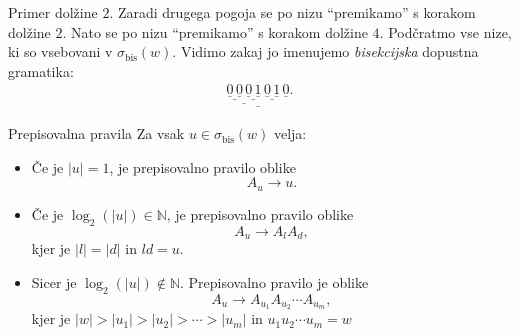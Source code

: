 \documentclass{beamer}
\theoremstyle{definition}
\providecommand{\abs}[1]{\left\lvert #1 \right\rvert}
\newcommand{\N}{\mathbb{N}}
\begin{document}
\begin{frame}
{\begin{exampleblock}{Primer}
            dolžine $2$. Zaradi drugega pogoja se po nizu ``premikamo'' s korakom dolžine $2$.
            Nato se po nizu ``premikamo'' s korakom dolžine $4$. 
            Podčratmo vse nize, ki so vsebovani v $\sigma_{\text{bis}}(w)$. Vidimo zakaj jo imenujemo
            \emph{bisekcijska} dopustna gramatika:
            \begin{gather*}
                \underline{\underline{\underline{\underline{0} \, \underline{0}} \,
                \underline{\underline{0} \, \underline{1}}} \, \underline{\underline{0} \, \underline{1}}
                \, \underline{0}}.
            \end{gather*}
        \end{exampleblock}
    }
\end{frame}

\begin{frame}
    \begin{block}{Prepisovalna pravila}
        Za vsak $u \in \sigma_{\text{bis}}(w)$ velja:
        \begin{itemize}
            \item Če je $\abs{u} = 1$, je prepisovalno pravilo oblike
            \[
                A_u \rightarrow u.
            \]
            \item Če je $\log_2(\abs{u}) \in \N$, je prepisovalno pravilo oblike 
            \[
                A_u \rightarrow A_lA_d,
            \]
            kjer je $\abs{l} = \abs{d}$ in $ld = u$.
            \item Sicer je $\log_2(\abs{u}) \notin \N$. Prepisovalno pravilo je oblike 
            \[
                A_u \rightarrow A_{u_1}A_{u_2} \cdots A_{u_m},
            \]
            kjer je  $\abs{w} > \abs{u_1} > \abs{u_2} > \cdots > \abs{u_m}$ in $u_1u_2 \cdots u_m = w$
        \end{itemize}
    \end{block}
\end{frame}
\end{document}
